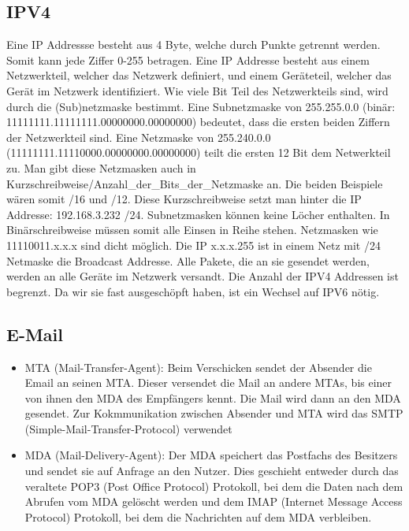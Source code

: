 \documentclass{article}
\begin{document}
\subsection*{IPV4}
Eine IP Addressse besteht aus 4 Byte, welche durch Punkte getrennt werden. Somit kann jede Ziffer 0-255 betragen.
Eine IP Addresse besteht aus einem Netzwerkteil, welcher das Netzwerk definiert, und einem Geräteteil, welcher das
Gerät im Netzwerk identifiziert. Wie viele Bit Teil des Netzwerkteils sind, wird durch die (Sub)netzmaske bestimmt.
Eine Subnetzmaske von 255.255.0.0 (binär: 11111111.11111111.00000000.00000000) bedeutet, dass die ersten beiden Ziffern 
der Netzwerkteil sind. Eine Netzmaske von 255.240.0.0 (11111111.11110000.00000000.00000000) teilt die ersten 12 Bit dem Netwerkteil
zu. Man gibt diese Netzmasken auch in Kurzschreibweise\newline /Anzahl\_der\_Bits\_der\_Netzmaske an. Die beiden Beispiele wären somit 
/16 und /12. Diese Kurzschreibweise setzt man hinter die IP Addresse: 192.168.3.232 /24. Subnetzmasken können keine Löcher enthalten.
In Binärschreibweise müssen somit alle Einsen in Reihe stehen. Netzmasken wie 11110011.x.x.x sind dicht möglich. Die IP 
x.x.x.255 ist in einem Netz mit /24 Netmaske die Broadcast Addresse. Alle Pakete, die an sie gesendet werden, werden an alle Geräte
im Netzwerk versandt. Die Anzahl der IPV4 Addressen ist begrenzt. Da wir sie fast ausgeschöpft haben, ist ein Wechsel auf IPV6 nötig.

\subsection*{E-Mail}
\begin{itemize}
    \item MTA (Mail-Transfer-Agent): Beim Verschicken sendet der Absender die Email an seinen MTA.
    Dieser versendet die Mail an andere MTAs, bis einer von ihnen den MDA des Empfängers kennt.
    Die Mail wird dann an den MDA gesendet. Zur Kokmmunikation zwischen Absender und MTA wird das
    SMTP (Simple-Mail-Transfer-Protocol) verwendet
    \item MDA (Mail-Delivery-Agent): Der MDA speichert das Postfachs des Besitzers und sendet sie auf 
    Anfrage an den Nutzer. Dies geschieht entweder durch das veraltete POP3 (Post Office Protocol) Protokoll,
    bei dem die Daten nach dem Abrufen vom MDA gelöscht werden und dem IMAP (Internet Message Access Protocol) Protokoll,
    bei dem die Nachrichten auf dem MDA verbleiben.
\end{itemize}
\end{document}

